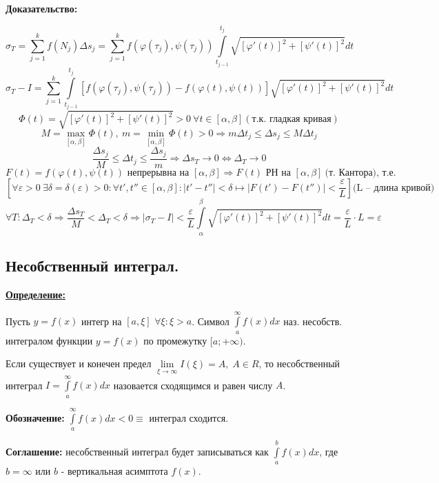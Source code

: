 \documentclass[a4paper,12pt]{article} %
\begin{document}
\textbf{Доказательство:} 

\[ \sigma_T = \sum\limits_{j=1}^{k} f(N_j) \Delta s_j = \sum\limits_{j=1}^{k} f(\varphi(\tau_j), \psi(\tau_j))  \int\limits_{t_{j-1}}^{t_j} \sqrt{\left[ \varphi'(t) \right]^2 + \left[ \psi'(t) \right]^2}dt \]
\[ \sigma_T - I = \sum\limits_{j=1}^{k} \int\limits_{t_{j-1}}^{t_j} \left[ f(\varphi(\tau_j), \psi(\tau_j)) - f(\varphi(t), \psi(t)) \right] \sqrt{\left[ \varphi'(t) \right]^2 + \left[ \psi'(t) \right]^2}dt \]
\[ \Phi (t) = \sqrt{\left[ \varphi'(t) \right]^2 + \left[ \psi'(t) \right]^2} > 0 \ \forall t \in [\alpha, \beta] (\text{т.к. гладкая кривая}) \]
\[ M = \max\limits_{[\alpha, \beta]} \Phi(t), \ m = \min\limits_{[\alpha, \beta]} \Phi(t) > 0 \Rightarrow m \Delta t_j \leqslant \Delta s_j \leqslant M \Delta t_j \]
\[ \dfrac{\Delta s_j}{M} \leqslant \Delta t_j \leqslant \dfrac{\Delta s_j}{m} \Rightarrow \Delta s_T \to 0 \Leftrightarrow \Delta_T \to 0 \]
\[F(t) = f(\varphi(t), \psi(t)) \text{ непрерывна на } [\alpha, \beta] \Rightarrow F(t) \text{ РН на } [\alpha, \beta] \ \text{(т. Кантора), т.е.} \]
\[ \left[ \forall \varepsilon > 0 \ \exists \delta = \delta (\varepsilon) > 0: \forall t', t'' \in [\alpha, \beta]: |t' - t''| < \delta \mapsto |F(t') - F(t'')| < \dfrac{\varepsilon}{L} \right] \text{(L -- длина кривой)} \]
\[ \forall T: \Delta_T < \delta \Rightarrow \dfrac{\Delta s_T}{M} < \Delta_T < \delta \Rightarrow \left| \sigma_T - I \right|< \dfrac{\varepsilon}{L} \int\limits_{\alpha}^{\beta} \sqrt{\left[ \varphi'(t) \right]^2 + \left[ \psi'(t) \right]^2} dt = \dfrac{\varepsilon}{L} \cdot L = \varepsilon \]
\subsection{Несобственный интеграл.}

\underline{\textbf{Определение:}} 

Пусть $y=f(x)$ интегр на $[a, \xi]$ $\forall \xi:\xi>a $. Символ $\int\limits_a^{\infty} f(x) dx   $ наз. несобств. интегралом функции $y=f(x)$ по промежутку $[a; +\infty)$.

Если существует и конечен предел $\lim\limits_{\xi \rightarrow \infty} I(\xi) = A, \; A\in R$, то несобственный интеграл $I=\int\limits_a^{\infty} f(x) dx$ назовается сходящимся и равен числу $A$.

\textbf{Обозначение:} $\int\limits_a^{\infty} f(x) dx < 0 \equiv$ интеграл сходится.

\textbf{Соглашение:} несобственный интеграл будет записываться как $\int\limits_a^{b} f(x) dx$, где $b = \infty$ или $b$ - вертикальная асимптота $f(x)$.\\
\end{document}
